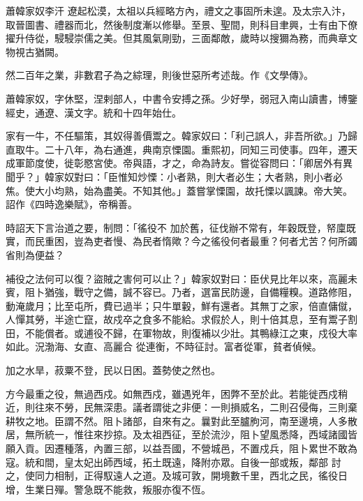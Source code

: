 
\begin{pinyinscope}

 蕭韓家奴李汗
 遼起松漠，太祖以兵經略方內，禮文之事固所未遑。及太宗入汴，取晉圖書、禮器而北，然後制度漸以修舉。至景、聖間，則科目聿興，士有由下僚擢升侍從，駸駸崇儒之美。但其風氣剛勁，三面鄰敵，歲時以搜獮為務，而典章文物視古猶闕。



 然二百年之業，非數君子為之綜理，則後世惡所考述哉。作《文學傳》。



 蕭韓家奴，字休堅，涅剌部人，中書令安搏之孫。少好學，弱冠入南山讀書，博鑒經史，通遼、漢文字。統和十四年始仕。



 家有一牛，不任驅策，其奴得善價鬻之。韓家奴曰：「利己誤人，非吾所欲。」乃歸直取牛。二十八年，為右通進，典南京慄園。重熙初，同知三司使事。四年，遷天成軍節度使，徙彰愍宮使。帝與語，才之，命為詩友。嘗從容問曰：「卿居外有異聞乎？」韓家奴對曰：「臣惟知炒慄：小者熟，則大者必生；大者熟，則小者必焦。使大小均熟，始為盡美。不知其他。」蓋嘗掌慄園，故托慄以諷諫。帝大笑。詔作《四時逸樂賦》，帝稱善。



 時詔天下言治道之要，制問：「徭役不
 加於舊，征伐辦不常有，年穀既登，帑廩既實，而民重困，豈為吏者慢、為民者惰歟？今之徭役何者最重？何者尤苦？何所蠲省則為便益？



 補役之法何可以復？盜賊之害何可以止？」韓家奴對曰：臣伏見比年以來，高麗未賓，阻卜猶強，戰守之備，誠不容已。乃者，選富民防邊，自備糧糗。道路修阻，動淹歲月；比至屯所，費已過半；只牛單轂，鮮有還者。其無丁之家，倍直傭僦，人憚其勞，半途亡竄，故戍卒之食多不能給。求假於人，則十倍其息，至有鬻子割田，不能償者。或逋役不歸，在軍物故，則復補以少壯。其鴨綠江之東，戍役大率如此。況渤海、女直、高麗合
 從連衡，不時征討。富者從軍，貧者偵候。



 加之水旱，菽粟不登，民以日困。蓋勢使之然也。



 方今最重之役，無過西戍。如無西戍，雖遇兇年，困弊不至於此。若能徙西戍稍近，則往來不勞，民無深患。議者謂徙之非便：一則損威名，二則召侵侮，三則棄耕牧之地。臣謂不然。阻卜諸部，自來有之。曩對此至臚朐河，南至邊境，人多散居，無所統一，惟往來抄掠。及太祖西征，至於流沙，阻卜望風悉降，西域諸國皆願入貢。因遷種落，內置三部，以益吾國，不營城邑，不置戍兵，阻卜累世不敢為寇。統和間，皇太妃出師西域，拓土既遠，降附亦眾。自後一部或叛，鄰部
 討之，使同力相制，正得馭遠人之道。及城可敦，開境數千里，西北之民，徭役日增，生業日殫。警急既不能救，叛服亦復不恆。




\end{pinyinscope}
